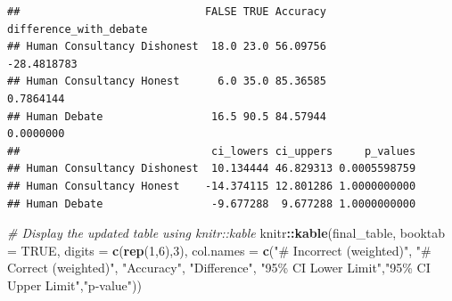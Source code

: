 \documentclass[
]{article}
\newenvironment{Shaded}{\begin{snugshade}}{\end{snugshade}}
\newcommand{\AttributeTok}[1]{\textcolor[rgb]{0.13,0.29,0.53}{#1}}
\newcommand{\CommentTok}[1]{\textcolor[rgb]{0.56,0.35,0.01}{\textit{#1}}}
\newcommand{\ConstantTok}[1]{\textcolor[rgb]{0.56,0.35,0.01}{#1}}
\newcommand{\DecValTok}[1]{\textcolor[rgb]{0.00,0.00,0.81}{#1}}
\newcommand{\FunctionTok}[1]{\textcolor[rgb]{0.13,0.29,0.53}{\textbf{#1}}}
\newcommand{\NormalTok}[1]{#1}
\newcommand{\OtherTok}[1]{\textcolor[rgb]{0.56,0.35,0.01}{#1}}
\newcommand{\SpecialCharTok}[1]{\textcolor[rgb]{0.81,0.36,0.00}{\textbf{#1}}}
\newcommand{\StringTok}[1]{\textcolor[rgb]{0.31,0.60,0.02}{#1}}
\begin{document}
\begin{Shaded}
\end{Shaded}

\begin{verbatim}
##                             FALSE TRUE Accuracy difference_with_debate
## Human Consultancy Dishonest  18.0 23.0 56.09756            -28.4818783
## Human Consultancy Honest      6.0 35.0 85.36585              0.7864144
## Human Debate                 16.5 90.5 84.57944              0.0000000
##                              ci_lowers ci_uppers     p_values
## Human Consultancy Dishonest  10.134444 46.829313 0.0005598759
## Human Consultancy Honest    -14.374115 12.801286 1.0000000000
## Human Debate                 -9.677288  9.677288 1.0000000000
\end{verbatim}

\begin{Shaded}
\begin{Highlighting}[]
\CommentTok{\# Display the updated table using knitr::kable}
\NormalTok{knitr}\SpecialCharTok{::}\FunctionTok{kable}\NormalTok{(final\_table, }\AttributeTok{booktab =} \ConstantTok{TRUE}\NormalTok{,  }\AttributeTok{digits =} \FunctionTok{c}\NormalTok{(}\FunctionTok{rep}\NormalTok{(}\DecValTok{1}\NormalTok{,}\DecValTok{6}\NormalTok{),}\DecValTok{3}\NormalTok{),}
             \AttributeTok{col.names =} \FunctionTok{c}\NormalTok{(}\StringTok{"\# Incorrect (weighted)"}\NormalTok{, }\StringTok{"\# Correct (weighted)"}\NormalTok{, }\StringTok{"Accuracy"}\NormalTok{, }\StringTok{"Difference"}\NormalTok{, }\StringTok{"95\% CI Lower Limit"}\NormalTok{,}\StringTok{"95\% CI Upper Limit"}\NormalTok{,}\StringTok{"p{-}value"}\NormalTok{))}
\end{Highlighting}
\end{Shaded}
\end{document}
